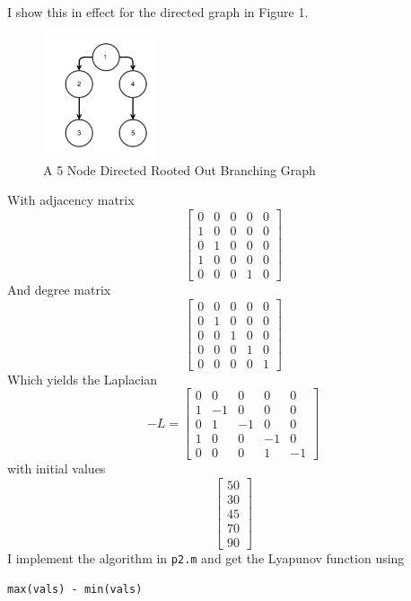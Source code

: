 \documentclass{article}
\begin{document}
I show this in effect for the directed graph in Figure 1. 
\begin{figure}[h!]
\centering
\caption{A 5 Node Directed Rooted Out Branching Graph}
\includegraphics[width=0.3\textwidth]{p2graph.png}
\end{figure}
With adjacency matrix
\[ \begin{bmatrix}
     0  &  0   & 0   & 0  &  0\\
     1  &  0  &  0  &  0  &  0\\
     0  &  1  &  0  &  0  &  0\\
     1  &  0  &  0  &  0  &  0\\
     0  &  0  &  0  &  1  &  0
\end{bmatrix}\]
And degree matrix
\[ \begin{bmatrix}
     0  &  0  &  0  &  0  &  0\\
     0  &  1  &  0  &  0  &  0\\
     0  &  0  &  1  &  0  &  0\\
     0  &  0  &  0  &  1  &  0\\
     0  &  0  &  0  &  0  &  1
\end{bmatrix} \]
Which yields the Laplacian
\[ -L = \begin{bmatrix}
     0  &  0  &  0  &  0  &  0\\
     1  & -1  &  0  &  0  &  0\\
     0  &  1  & -1  &  0  &  0\\
     1  &  0  &  0  & -1  &  0\\
     0  &  0  &  0  &  1  & -1
\end{bmatrix} \]
with initial values
\[ \begin{bmatrix}
    50\\
    30\\
    45\\
    70\\
    90
\end{bmatrix} \]
I implement the algorithm in \texttt{p2.m} and get the Lyapunov function using
\begin{verbatim}
max(vals) - min(vals)
\end{verbatim}
\end{document}
